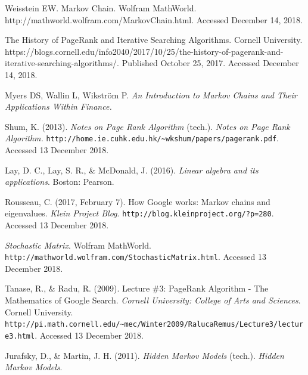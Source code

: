 \documentclass{article}
\begin{document}


\begin{thebibliography}{4}

Weisstein EW. Markov Chain. Wolfram MathWorld. http://mathworld.wolfram.com/MarkovChain.html. Accessed December 14, 2018.

The History of PageRank and Iterative Searching Algorithms. Cornell University. https://blogs.cornell.edu/info2040/2017/10/25/the-history-of-pagerank-and-iterative-searching-algorithms/. Published October 25, 2017. Accessed December 14, 2018.

Myers DS, Wallin L, Wikström P. \textit{An Introduction to Markov Chains and Their Applications Within Finance.}

Shum, K. (2013). \textit{Notes on Page Rank Algorithm} (tech.). \textit{Notes on Page Rank Algorithm.} \texttt{http://home.ie.cuhk.edu.hk/\~{}wkshum/papers/pagerank.pdf}. Accessed 13 December 2018.

Lay, D. C., Lay, S. R., \& McDonald, J. (2016). \textit{Linear algebra and its applications}. Boston: Pearson.

Rousseau, C. (2017, February 7). How Google works: Markov chains and eigenvalues. \textit{Klein Project Blog}. \texttt{http://blog.kleinproject.org/?p=280}. Accessed 13 December 2018.

\textit{Stochastic Matrix}. Wolfram MathWorld. \texttt{http://mathworld.wolfram.com/StochasticMatrix.html}. Accessed 13 December 2018.

Tanase, R., \& Radu, R. (2009). Lecture \#3: PageRank Algorithm - The Mathematics of Google Search. 
\textit{Cornell University: College of Arts and Sciences}. Cornell University. \texttt{http://pi.math.cornell.edu/\~{}mec/Winter2009/RalucaRemus/Lecture3/lecture3.html}. Accessed 13 December 2018.

Jurafsky, D., \& Martin, J. H. (2011). \textit{Hidden Markov Models} (tech.). \textit{Hidden Markov Models}.

\end{thebibliography}
\end{document}
